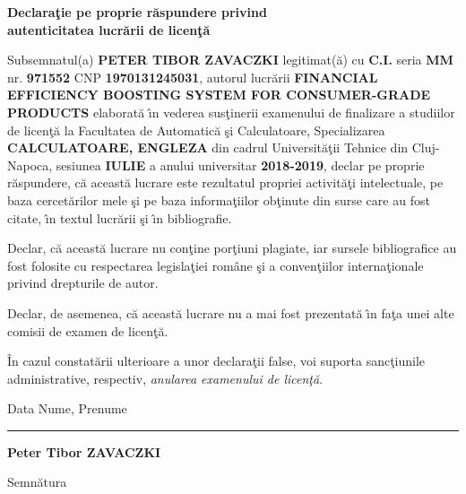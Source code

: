 \documentclass[12pt,a4paper,twoside]{report}
\renewcommand{\thesisauthor}{Peter Tibor ZAVACZKI}    %
\renewcommand{\thesistitle}{FINANCIAL EFFICIENCY BOOSTING SYSTEM FOR CONSUMER-GRADE PRODUCTS}
\newcommand{\uline}[1]{\rule[0pt]{#1}{0.4pt}}
\begin{document}
\vspace{0.5cm}

\begin{center}
  {\bf
    Declara\c{t}ie pe proprie r\u{a}spundere privind\\
    autenticitatea lucr\u{a}rii de licen\c{t}\u{a}}
\end{center}
\vspace{1cm}



Subsemnatul(a) \textbf{PETER TIBOR ZAVACZKI} legitimat(\u{a}) cu \textbf{C.I.} seria \textbf{MM} nr. \textbf{971552} CNP \textbf{1970131245031}, autorul lucr\u{a}rii \textbf{\thesistitle}
elaborat\u{a} \^{\i}n vederea sus\c{t}inerii examenului de finalizare a studiilor de licen\c{t}\u{a} la Facultatea de Automatic\u{a} \c{s}i Calculatoare, Specializarea \textbf{CALCULATOARE, ENGLEZA} din cadrul Universit\u{a}\c{t}ii Tehnice din Cluj-Napoca, sesiunea \textbf{IULIE} a anului universitar \textbf{2018-2019}, declar pe proprie r\u{a}spundere, c\u{a} aceast\u{a} lucrare este rezultatul propriei activit\u{a}\c{t}i intelectuale, pe baza cercet\u{a}rilor mele \c{s}i pe baza informa\c{t}iilor ob\c{t}inute din surse care au fost citate, \^{\i}n textul lucr\u{a}rii \c{s}i \^{\i}n bibliografie.

Declar, c\u{a} aceast\u{a} lucrare nu con\c{t}ine por\c{t}iuni plagiate, iar sursele bibliografice au fost folosite cu
respectarea legisla\c{t}iei rom\^{a}ne \c{s}i a conven\c{t}iilor interna\c{t}ionale privind drepturile de autor.

Declar, de asemenea, c\u{a} aceast\u{a} lucrare nu a mai fost prezentat\u{a} \^{\i}n fa\c{t}a unei alte comisii de examen de licen\c{t}\u{a}.

\^{I}n cazul constat\u{a}rii ulterioare a unor declara\c{t}ii false, voi suporta sanc\c{t}iunile administrative, respectiv, \emph{anularea examenului de licen\c{t}\u{a}}.

\vspace{1.5cm}

Data \hspace{8cm} Nume, Prenume

\vspace{0.5cm}

\uline{3cm} \hspace{5cm} \textbf{\thesisauthor}

\vspace{0.5cm}
\hspace{9.4cm}Semn\u{a}tura

\thispagestyle{empty}
\newpage
$ $
\thispagestyle{empty}
\newpage
\end{document}
